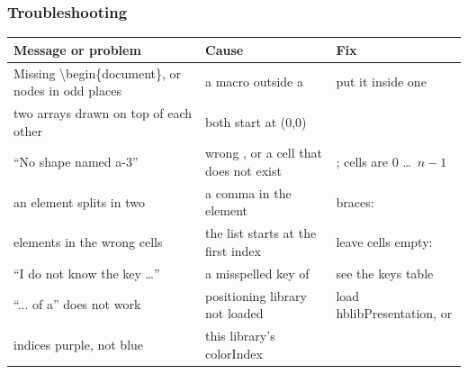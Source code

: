 \documentclass[aspectratio=169,10pt,compress]{beamer}
\begin{document}




\begin{frame}[t,fragile] \frametitle{Troubleshooting}

\begin{table}
		\scriptsize
		\begin{tabular}{@{}L{0.36\textwidth}L{0.28\textwidth}L{0.28\textwidth}@{}}
			\toprule
			\textbf{Message or problem} & \textbf{Cause} & \textbf{Fix} \\
			\midrule
			Missing \textbackslash begin\{document\}, or nodes in odd places & a macro outside a  & put it inside one \\
			two arrays drawn on top of each other & both start at (0,0) &  \\
			``No shape named a-3'' & wrong , or a cell that does not exist & ; cells are 0 \dots\ $n-1$ \\
			an element splits in two & a comma in the element & braces:  \\
			 elements in the wrong cells & the list starts at the first index & leave cells empty:  \\
			``I do not know the key \dots'' & a misspelled key of  & see the keys table \\
			``... of a'' does not work & positioning library not loaded & load hblibPresentation, or  \\
			indices purple, not blue & this library's colorIndex &  \\
			\bottomrule
		\end{tabular}
\end{table}%
\end{frame}
\end{document}
